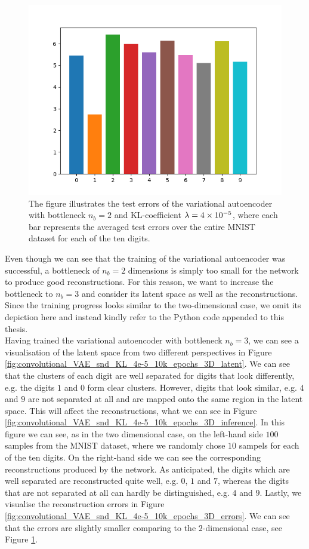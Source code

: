 \begin{figure}
\begin{center}
      \includegraphics[width=0.49\linewidth]{convolutional_VAE_snd_KL_4e-5_10k_epochs_2D_errors}
\end{center}
\caption{The figure illustrates the test errors of the variational autoencoder with bottleneck $n_b=2$ and KL-coefficient $\lambda = \num{4e-5}$, where each bar represents the averaged test errors over the entire MNIST dataset for each of the ten digits.}\label{fig:convolutional_VAE_snd_KL_4e-5_10k_epochs_2D_errors}
\end{figure}


Even though we can see that the training of the variational autoencoder was successful, a bottleneck of $n_b=2$ dimensions is simply too small for the network to produce good reconstructions. For this reason, we want to increase the bottleneck to $n_b=3$ and consider its latent space as well as the reconstructions. Since the training progress looks similar to the two-dimensional case, we omit its depiction here and instead kindly refer to the Python code appended to this thesis.\\
Having trained the variational autoencoder with bottleneck $n_b=3$, we can see a visualisation of the latent space from two different perspectives in Figure \ref{fig:convolutional_VAE_snd_KL_4e-5_10k_epochs_3D_latent}. We can see that the clusters of each digit are well separated for digits that look differently, e.g. the digits $1$ and $0$ form clear clusters. However, digits that look similar, e.g. $4$ and $9$ are not separated at all and are mapped onto the same region in the latent space. This will affect the reconstructions, what we can see in Figure \ref{fig:convolutional_VAE_snd_KL_4e-5_10k_epochs_3D_inference}. In this figure we can see, as in the two dimensional case, on the left-hand side $100$ samples from the MNIST dataset, where we randomly chose $10$ sampels for each of the ten digits. On the right-hand side we can see the corresponding reconstructions produced by the network. As anticipated, the digits which are well separated are reconstructed quite well, e.g. $0$, $1$ and $7$, whereas the digits that are not separated at all can hardly be distinguished, e.g. $4$ and $9$. Lastly, we visualise the reconstruction errors in Figure \ref{fig:convolutional_VAE_snd_KL_4e-5_10k_epochs_3D_errors}. We can see that the errors are slightly smaller comparing to the $2$-dimensional case, see Figure \ref{fig:convolutional_VAE_snd_KL_4e-5_10k_epochs_2D_errors}.


